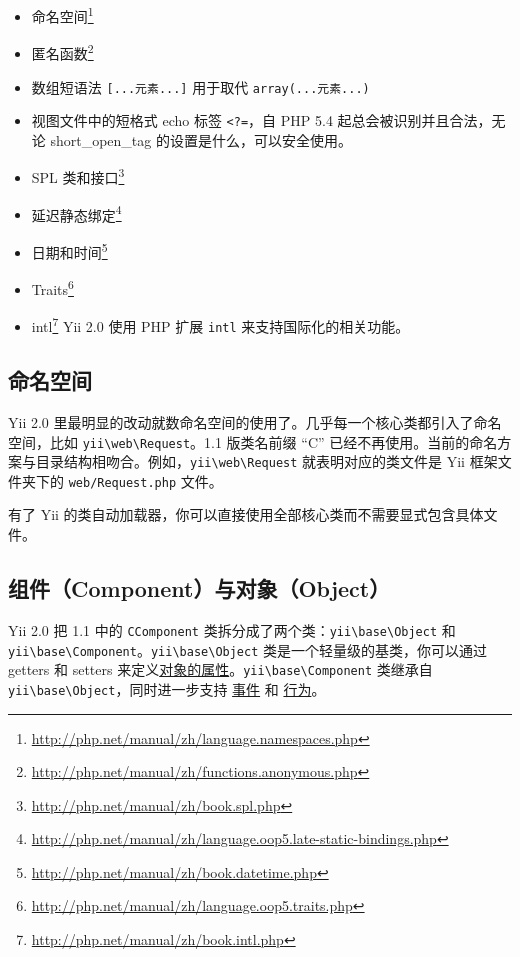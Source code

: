 \begin{itemize}
\item 命名空间\footnote{\url{http://php.net/manual/zh/language.namespaces.php}}
\item 匿名函数\footnote{\url{http://php.net/manual/zh/functions.anonymous.php}}
\item 数组短语法 \lstinline|[...元素...]| 用于取代 \lstinline|array(...元素...)|
\item 视图文件中的短格式 echo 标签 \lstinline|<?=|，自 PHP 5.4 起总会被识别并且合法，无论 short\_open\_tag 的设置是什么，可以安全使用。
\item SPL 类和接口\footnote{\url{http://php.net/manual/zh/book.spl.php}}
\item 延迟静态绑定\footnote{\url{http://php.net/manual/zh/language.oop5.late-static-bindings.php}}
\item 日期和时间\footnote{\url{http://php.net/manual/zh/book.datetime.php}}
\item Traits\footnote{\url{http://php.net/manual/zh/language.oop5.traits.php}}
\item intl\footnote{\url{http://php.net/manual/zh/book.intl.php}} Yii 2.0 使用 PHP 扩展 \lstinline|intl| 来支持国际化的相关功能。
\end{itemize}
\subsection{命名空间}
Yii 2.0 里最明显的改动就数命名空间的使用了。几乎每一个核心类都引入了命名空间，比如 \lstinline|yii\web\Request|。1.1 版类名前缀 “C” 已经不再使用。当前的命名方案与目录结构相吻合。例如，\lstinline|yii\web\Request| 就表明对应的类文件是 Yii 框架文件夹下的 \lstinline|web/Request.php| 文件。

有了 Yii 的类自动加载器，你可以直接使用全部核心类而不需要显式包含具体文件。

\subsection{组件（Component）与对象（Object）}
Yii 2.0 把 1.1 中的 \lstinline|CComponent| 类拆分成了两个类：\texttt{yii{\allowbreak{}\textbackslash}base{\allowbreak{}\textbackslash}Object} 和 \texttt{yii{\allowbreak{}\textbackslash}base{\allowbreak{}\textbackslash}Component}。\texttt{yii{\allowbreak{}\textbackslash}base{\allowbreak{}\textbackslash}Object} 类是一个轻量级的基类，你可以通过 getters 和 setters 来定义\hyperref[concept-properties.md]{对象的属性}。\texttt{yii{\allowbreak{}\textbackslash}base{\allowbreak{}\textbackslash}Component} 类继承自 \texttt{yii{\allowbreak{}\textbackslash}base{\allowbreak{}\textbackslash}Object}，同时进一步支持 \hyperref[concept-events.md]{事件} 和 \hyperref[concept-behaviors.md]{行为}。

